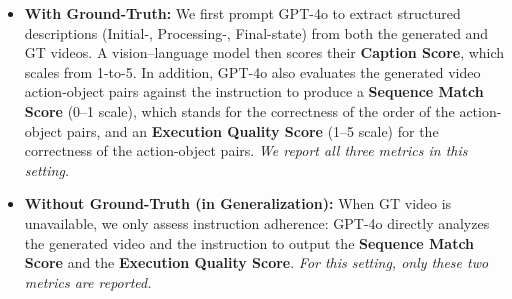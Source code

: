 \begin{itemize}
    \item \textbf{With Ground-Truth:} We first prompt GPT-4o to extract structured descriptions (Initial-, Processing-, Final-state) from both the generated and GT videos. A vision–language model then scores their \textbf{Caption Score}, which scales from 1-to-5. In addition, GPT-4o also evaluates the generated video action-object pairs against the instruction to produce a \textbf{Sequence Match Score} (0–1 scale), which stands for the correctness of the order of the action-object pairs, and an \textbf{Execution Quality Score} (1–5 scale) for the correctness of the action-object pairs. \emph{We report all three metrics in this setting.}
    \item \textbf{Without Ground-Truth (in Generalization):} When GT video is unavailable, we only assess instruction adherence: GPT-4o directly analyzes the generated video and the instruction to output the \textbf{Sequence Match Score} and the \textbf{Execution Quality Score}. \emph{For this setting, only these two metrics are reported.}
\end{itemize}

